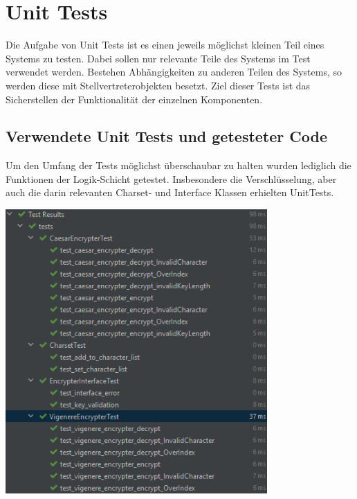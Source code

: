 \documentclass[12pt]{article}
\begin{document}
\section{Unit Tests}
Die Aufgabe von Unit Tests ist es einen jeweils möglichst kleinen Teil eines Systems zu testen. Dabei sollen nur relevante Teile des Systems im Test verwendet werden. Bestehen Abhängigkeiten zu anderen Teilen des Systems, so werden diese mit Stellvertreterobjekten besetzt. Ziel dieser Tests ist das Sicherstellen der Funktionalität der einzelnen Komponenten.

\subsection{Verwendete Unit Tests und getesteter Code}
Um den Umfang der Tests möglichst überschaubar zu halten wurden lediglich die Funktionen der Logik-Schicht getestet. Insbesondere die Verschlüsselung, aber auch die darin relevanten Charset- und Interface Klassen erhielten UnitTests.
\begin{center}
	\includegraphics[width=10cm]{bilder/Tests.png}
\end{center}
\end{document}
